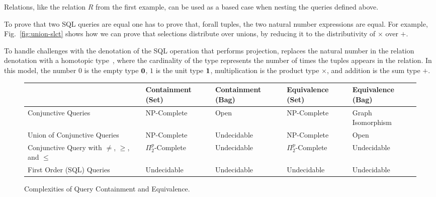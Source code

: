 Relations, like the relation $R$ from the first example, can be used as
a based case when nesting the queries defined above.

To prove that two
SQL queries are equal one has to prove that, forall tuples, the two natural number expressions
are equal. 
For example, Fig.~\ref{fig:union-slct}
shows how we can prove that selections distribute over unions, by
reducing it to the distributivity of $\times$ over $+$. 

To handle challenges with the denotation of the SQL operation that performs projection,
\sem replaces the natural number in the relation denotation with a homotopic type~\cite{hott-book}, where
the cardinality of the type represents the number of times the tuples appears in the relation. 
%
In this model, the number 
$0$ is the empty type $\textbf{0}$,
$1$ is the unit type $\textbf{1}$,
multiplication is the product type $\times$, and
addition is the sum type $+$.


\begin{figure*}
\centering
\begin{tabular}{|l|l|l|l|l|} \hline
 & Containment (Set)  & Containment (Bag) & Equivalence (Set) &  Equivalence (Bag) \\ \hline 
Conjunctive Queries & NP-Complete \cite{sql-hardness-cq-set} & Open & NP-Complete \cite{sql-hardness-cq-set}  &  Graph Isomorphism \cite{sql-hardness-cq-bag-equality} \\ \hline
% 
Union of Conjunctive Queries & NP-Complete \cite{sql-hardness-cqunion-set}  & Undecidable \cite{sql-hardness-cqunion-bag-containment}  & NP-Complete \cite{sql-hardness-cqunion-set}  & Open \\ \hline 
%
Conjunctive Query with $\neq$, $\geq$, and $\leq$ & 
$\Pi_2^p$-Complete \cite{sql-hardness-cqex-set} & Undecidable  \cite{sql-hardness-cqex-bag} &  $\Pi_2^p$-Complete  \cite{sql-hardness-cqex-set}  & Undecidable \cite{sql-hardness-cqex-bag}  \\ \hline
%
First Order (SQL) Queries & Undecidable \cite{sql-hardness-first-order} & Undecidable  \cite{sql-hardness-first-order} & Undecidable  \cite{sql-hardness-first-order} & Undecidable  \cite{sql-hardness-first-order} \\ \hline
\end{tabular}
\caption{Complexities of Query Containment and Equivalence.}
\label{fig:complexity}
\end{figure*} 

